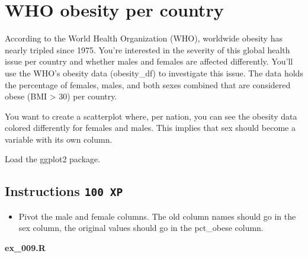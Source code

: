 \documentclass[
  letterpaper,
  DIV=11,
  numbers=noendperiod]{scrreprt}
\providecommand{\tightlist}{%
  \setlength{\itemsep}{0pt}\setlength{\parskip}{0pt}}\usepackage{longtable,booktabs,array}
\begin{document}
\hypertarget{who-obesity-per-country}{%
\section{WHO obesity per country}\label{who-obesity-per-country}}

According to the World Health Organization (WHO), worldwide obesity has
nearly tripled since 1975. You're interested in the severity of this
global health issue per country and whether males and females are
affected differently. You'll use the WHO's obesity data (obesity\_df) to
investigate this issue. The data holds the percentage of females, males,
and both sexes combined that are considered obese (BMI \textgreater{}
30) per country.

You want to create a scatterplot where, per nation, you can see the
obesity data colored differently for females and males. This implies
that sex should become a variable with its own column.

Load the ggplot2 package.

\hypertarget{instructions-100-xp-8}{%
\subsection*{\texorpdfstring{Instructions
\texttt{100\ XP}}{Instructions 100 XP}}\label{instructions-100-xp-8}}

\begin{itemize}
\tightlist
\item
  Pivot the male and female columns. The old column names should go in
  the sex column, the original values should go in the pct\_obese
  column.
\end{itemize}

\textbf{ex\_009.R}
\end{document}
